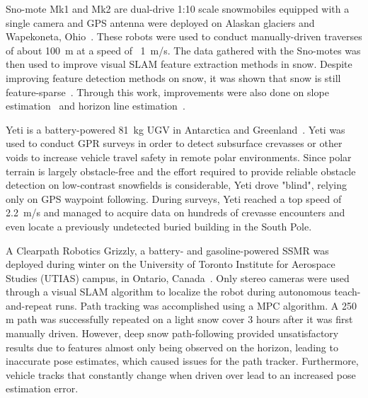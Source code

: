 Sno-mote Mk1 and Mk2 are dual-drive 1:10 scale snowmobiles equipped with a single camera and \ac{GPS} antenna were deployed on Alaskan glaciers and Wapekoneta, Ohio~\citep{Williams2009}.
These robots were used to conduct manually-driven traverses of about \SI{100}{m} at a speed of ~\SI{1}{m/s}.
The data gathered with the Sno-motes was then used to improve visual \ac{SLAM} feature extraction methods in snow. 
Despite improving feature detection methods on snow, it was shown that snow is still feature-sparse~\citep{Williams2009}.
Through this work, improvements were also done on slope estimation~\citep{Williams2010} and horizon line estimation~\citep{Williams2011}.

Yeti is a battery-powered \SI{81}{kg} \ac{UGV} in Antarctica and Greenland~\citep{Lever2013}. 
Yeti was used to conduct \ac{GPR} surveys in order to detect subsurface crevasses or other voids to increase vehicle travel safety in remote polar environments.
Since polar terrain is largely obstacle-free and the effort required to provide reliable obstacle detection on low-contrast snowfields is considerable, Yeti drove "blind", relying only on \ac{GPS} waypoint following.
During surveys, Yeti reached a top speed of \SI{2.2}{m/s} and managed to acquire data on hundreds of crevasse encounters and even locate a previously undetected buried building in the South Pole.

A Clearpath Robotics Grizzly, a battery- and gasoline-powered \ac{SSMR} was deployed during winter on the University of Toronto Institute for Aerospace Studies (UTIAS) campus, in Ontario, Canada~\citep{Paton2017}.
Only stereo cameras were used through a visual \ac{SLAM} algorithm to localize the robot during autonomous teach-and-repeat runs. 
Path tracking was accomplished using a \ac{MPC} algorithm.
A 250 m path was successfully repeated on a light snow cover 3 hours after it was first manually driven. 
However, deep snow path-following provided unsatisfactory results due to features almost only being observed on the horizon, leading to inaccurate pose estimates, which caused issues for the path tracker.
Furthermore, vehicle tracks that constantly change when driven over lead to an increased pose estimation error.

